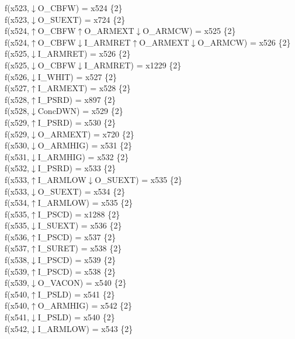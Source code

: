 f(x523,$\downarrow$O\_CBFW) = x524 \{2\} \\  
f(x523,$\downarrow$O\_SUEXT) = x724 \{2\} \\  
f(x524,$\uparrow$O\_CBFW$\uparrow$O\_ARMEXT$\downarrow$O\_ARMCW) = x525 \{2\} \\  
f(x524,$\uparrow$O\_CBFW$\downarrow$I\_ARMRET$\uparrow$O\_ARMEXT$\downarrow$O\_ARMCW) = x526 \{2\} \\  
f(x525,$\downarrow$I\_ARMRET) = x526 \{2\} \\  
f(x525,$\downarrow$O\_CBFW$\downarrow$I\_ARMRET) = x1229 \{2\} \\  
f(x526,$\downarrow$I\_WHIT) = x527 \{2\} \\  
f(x527,$\uparrow$I\_ARMEXT) = x528 \{2\} \\  
f(x528,$\uparrow$I\_PSRD) = x897 \{2\} \\  
f(x528,$\downarrow$ConcDWN) = x529 \{2\} \\  
f(x529,$\uparrow$I\_PSRD) = x530 \{2\} \\  
f(x529,$\downarrow$O\_ARMEXT) = x720 \{2\} \\  
f(x530,$\downarrow$O\_ARMHIG) = x531 \{2\} \\  
f(x531,$\downarrow$I\_ARMHIG) = x532 \{2\} \\  
f(x532,$\downarrow$I\_PSRD) = x533 \{2\} \\  
f(x533,$\uparrow$I\_ARMLOW$\downarrow$O\_SUEXT) = x535 \{2\} \\  
f(x533,$\downarrow$O\_SUEXT) = x534 \{2\} \\  
f(x534,$\uparrow$I\_ARMLOW) = x535 \{2\} \\  
f(x535,$\uparrow$I\_PSCD) = x1288 \{2\} \\  
f(x535,$\downarrow$I\_SUEXT) = x536 \{2\} \\  
f(x536,$\uparrow$I\_PSCD) = x537 \{2\} \\  
f(x537,$\uparrow$I\_SURET) = x538 \{2\} \\  
f(x538,$\downarrow$I\_PSCD) = x539 \{2\} \\  
f(x539,$\uparrow$I\_PSCD) = x538 \{2\} \\  
f(x539,$\downarrow$O\_VACON) = x540 \{2\} \\  
f(x540,$\uparrow$I\_PSLD) = x541 \{2\} \\  
f(x540,$\uparrow$O\_ARMHIG) = x542 \{2\} \\  
f(x541,$\downarrow$I\_PSLD) = x540 \{2\} \\  
f(x542,$\downarrow$I\_ARMLOW) = x543 \{2\} \\  
